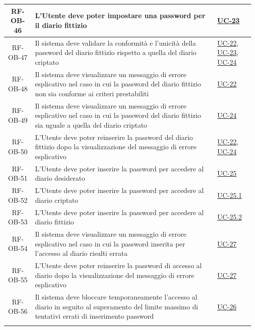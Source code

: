 \documentclass[a4paper,12pt]{article}
\begin{document}
\begin{center}
\begin{longtable}{|c|p{8.5cm}|>{\centering\arraybackslash}p{4cm}|}
\hline
\rowcolor{gray!20}
RF-OB-46 & L'Utente deve poter impostare una password per il diario fittizio & \hyperref[subsec:UC-23]{UC-23} \\
\hline
\rowcolor{white}
RF-OB-47 & Il sistema deve validare la conformità e l'unicità della password del diario fittizio rispetto a quella del diario criptato & \hyperref[subsec:UC-22]{UC-22}, \hyperref[subsec:UC-23]{UC-23}, \hyperref[subsec:UC-24]{UC-24} \\
\hline
\rowcolor{gray!20}
RF-OB-48 & Il sistema deve visualizzare un messaggio di errore esplicativo nel caso in cui la password del diario fittizio non sia conforme ai criteri prestabiliti & \hyperref[subsec:UC-22]{UC-22} \\
\hline
\rowcolor{white}
RF-OB-49 & Il sistema deve visualizzare un messaggio di errore esplicativo nel caso in cui la password del diario fittizio sia uguale a quella del diario criptato & \hyperref[subsec:UC-24]{UC-24} \\
\hline
\rowcolor{gray!20}
RF-OB-50 & L'Utente deve poter reinserire la password del diario fittizio dopo la visualizzazione del messaggio di errore esplicativo & \hyperref[subsec:UC-22]{UC-22}, \hyperref[subsec:UC-24]{UC-24} \\
\hline
\rowcolor{white}
RF-OB-51 & L'Utente deve poter inserire la password per accedere al diario desiderato & \hyperref[subsec:UC-25]{UC-25} \\
\hline
\rowcolor{gray!20}
RF-OB-52 & L'Utente deve poter inserire la password per accedere al diario criptato & \hyperref[subsec:UC-25.1]{UC-25.1} \\
\hline
\rowcolor{white}
RF-OB-53 & L'Utente deve poter inserire la password per accedere al diario fittizio & \hyperref[subsec:UC-25.2]{UC-25.2} \\
\hline
\rowcolor{gray!20}
RF-OB-54 & Il sistema deve visualizzare un messaggio di errore esplicativo nel caso in cui la password inserita per l'accesso al diario risulti errata & \hyperref[subsec:UC-27]{UC-27} \\
\hline
\rowcolor{white}
RF-OB-55 & L'Utente deve poter reinserire la password di accesso al diario dopo la visualizzazione del messaggio di errore esplicativo & \hyperref[subsec:UC-27]{UC-27} \\
\hline
\rowcolor{gray!20}
RF-OB-56 & Il sistema deve bloccare temporaneamente l'accesso al diario in seguito al superamento del limite massimo di tentativi errati di inserimento password & \hyperref[subsec:UC-26]{UC-26} \\
\hline
\rowcolor{white}

\end{longtable}
\end{center}
\end{document}
